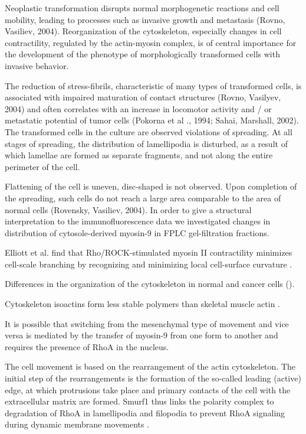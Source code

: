 \documentclass[num-refs]{wiley-article}
\begin{document}
Neoplastic transformation disrupts normal morphogenetic reactions and cell mobility, leading to processes such as invasive growth and metastasis (Rovno, Vasiliev, 2004).
Reorganization of the cytoskeleton, especially changes in cell contractility, regulated by the actin-myosin complex, is of central importance for the development of the phenotype of morphologically transformed cells with invasive behavior.

The reduction of stress-fibrils, characteristic of many types of transformed cells, is associated with impaired maturation of contact structures (Rovno, Vasilyev, 2004) and often correlates with an increase in locomotor activity and / or metastatic potential of tumor cells (Pokorna et al ., 1994; Sahai, Marshall, 2002).
The transformed cells in the culture are observed violations of spreading.
At all stages of spreading, the distribution of lamellipodia is disturbed, as a result of which lamellae are formed as separate fragments, and not along the entire perimeter of the cell.

Flattening of the cell is uneven, disc-shaped is not observed.
Upon completion of the spreading, such cells do not reach a large area comparable to the area of normal cells (Rovensky, Vasiliev, 2004).
In order to give a structural interpretation to the immunofluorescence data we investigated changes in distribution of cytosole-derived myosin-9 in FPLC gel-filtration fractions.

Elliott et al. find that Rho/ROCK-stimulated myosin II contractility minimizes cell-scale branching by recognizing and minimizing local cell-surface curvature \cite{elliott2015myosin}.

Differences in the organization of the cytoskeleton in normal and cancer cells (\cite{shutova2010normal}).

Cytoskeleton isoactins form less stable polymers than skeletal muscle actin \cite{khaitlina2001functional}.

It is possible that switching from the mesenchymal type of movement and vice versa is mediated by the transfer of myosin-9 from one form to another and requires the presence of RhoA in the nucleus.

The cell movement is based on the rearrangement of the actin cytoskeleton. The initial step of the rearrangements is the formation of the so-called leading (active) edge, at which protrusions take place and primary contacts of the cell with the extracellular matrix are formed.
Smurf1 thus links the polarity complex to degradation of RhoA in lamellipodia and filopodia to prevent RhoA signaling during dynamic membrane movements \cite{wang2003regulation}.


\fi
\end{document}

